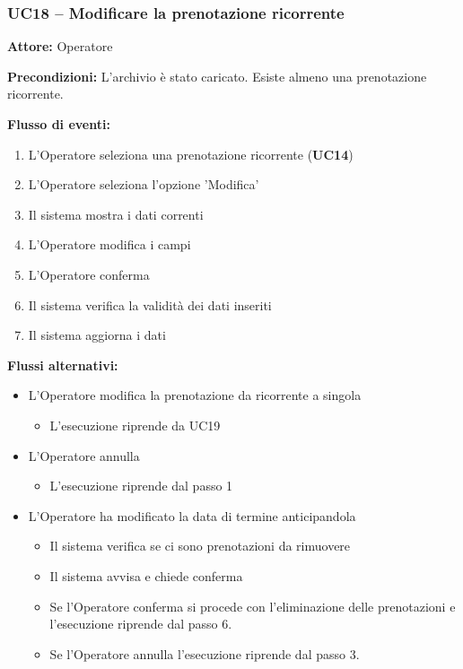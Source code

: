 \documentclass[a4paper,11pt]{article}
\begin{document}
\begin{samepage}
\subsubsection*{UC18 -- Modificare la prenotazione ricorrente}
\begin{ucbox}

\noindent\textbf{Attore:} Operatore\par
\noindent\textbf{Precondizioni:} L'archivio è stato caricato. Esiste almeno una prenotazione ricorrente.\par

\noindent\textbf{Flusso di eventi:}
\begin{enumerate}
\item L'Operatore seleziona una prenotazione ricorrente (\textbf{UC14})\item L'Operatore seleziona l'opzione 'Modifica' \item Il sistema mostra i dati correnti \item L'Operatore modifica i campi \item L'Operatore conferma \item Il sistema verifica la validità dei dati inseriti \item Il sistema aggiorna i dati \end{enumerate}
\noindent\textbf{Flussi alternativi:}
\begin{itemize}
\item[4a.] L'Operatore modifica la prenotazione da ricorrente a singola
\begin{itemize}
\item L'esecuzione riprende da UC19
\end{itemize}
\item[5a.] L'Operatore annulla
\begin{itemize}
\item L'esecuzione riprende dal passo 1
\end{itemize}
\item[6a.] L'Operatore ha modificato la data di termine anticipandola
\begin{itemize}
\item Il sistema verifica se ci sono prenotazioni da rimuovere
\item Il sistema avvisa e chiede conferma
\item Se l'Operatore conferma si procede con l'eliminazione delle prenotazioni e l'esecuzione riprende dal passo 6.
\item Se l'Operatore annulla l'esecuzione riprende dal passo 3.

\end{itemize}
\end{itemize}
\end{ucbox}
\end{samepage}
\end{document}
